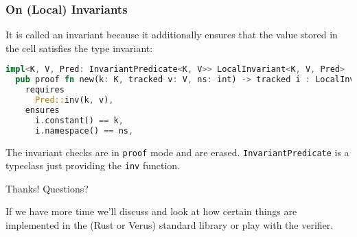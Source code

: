 \documentclass[
  aspectratio=1610, 
  xcolor={dvipsnames},
]{beamer}
\begin{document}
\begin{frame}[fragile]
  \frametitle{On (Local) Invariants}

  It is called an invariant because it additionally ensures that the value
  stored in the cell satisfies the type invariant:

  \begin{lstlisting}[language=rust]
impl<K, V, Pred: InvariantPredicate<K, V>> LocalInvariant<K, V, Pred>
  pub proof fn new(k: K, tracked v: V, ns: int) -> tracked i : LocalInvariant<K, V, Pred>
    requires
      Pred::inv(k, v),
    ensures
      i.constant() == k,
      i.namespace() == ns,
  \end{lstlisting}

  The invariant checks are in \lstinline|proof| mode and are erased.
  \lstinline|InvariantPredicate| is a typeclass just providing the
  \lstinline|inv| function.

\end{frame}

\begin{frame}
  
  \begin{center}
    {\Large Thanks! Questions?}

    If we have more time we'll discuss and look at how certain things are
    implemented in the (Rust or Verus) standard library or play with the
    verifier.
  \end{center}
  
\end{frame}
\end{document}
